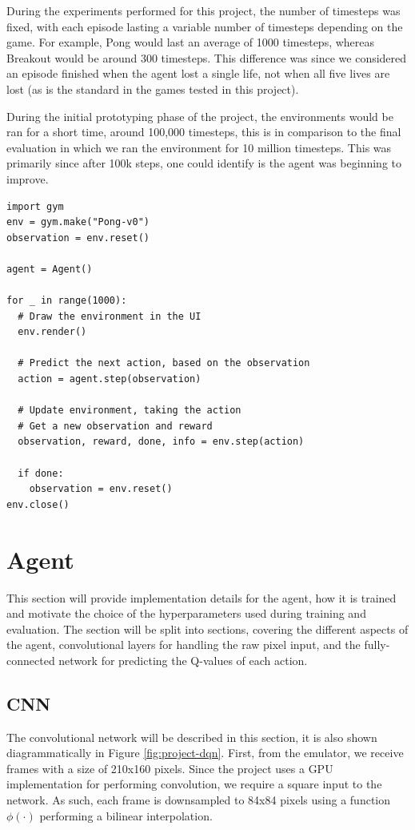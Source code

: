 During the experiments performed for this project, the number of timesteps was fixed, with each episode lasting a variable number of timesteps depending on the game. For example, Pong would last an average of 1000 timesteps, whereas Breakout would be around 300 timesteps. This difference was since we considered an episode finished when the agent lost a single life, not when all five lives are lost (as is the standard in the games tested in this project).

During the initial prototyping phase of the project, the environments would be ran for a short time, around 100,000 timesteps, this is in comparison to the final evaluation in which we ran the environment for 10 million timesteps. This was primarily since after 100k steps, one could identify is the agent was beginning to improve.

\begin{code}
	\label{code:basic-gym}
	\begin{verbatim}
import gym
env = gym.make("Pong-v0")
observation = env.reset()

agent = Agent()

for _ in range(1000):
  # Draw the environment in the UI
  env.render()

  # Predict the next action, based on the observation
  action = agent.step(observation)

  # Update environment, taking the action
  # Get a new observation and reward
  observation, reward, done, info = env.step(action)

  if done:
    observation = env.reset()
env.close()
\end{verbatim}
\end{code}

\section{Agent}
This section will provide implementation details for the agent, how it is trained and motivate the choice of the hyperparameters used during training and evaluation. The section will be split into sections, covering the different aspects of the agent, convolutional layers for handling the raw pixel input, and the fully-connected network for predicting the Q-values of each action.

\subsection{CNN}
\label{imple:cnn}
The convolutional network will be described in this section, it is also shown diagrammatically in Figure \ref{fig:project-dqn}. First, from the emulator, we receive frames with a size of 210x160 pixels. Since the project uses a GPU implementation for performing convolution, we require a square input to the network. As such, each frame is downsampled to 84x84 pixels using a function $\phi(\cdot)$ performing a bilinear interpolation.

